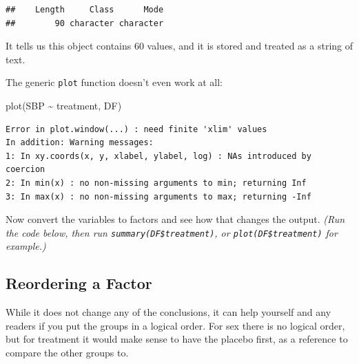 \documentclass[
]{book}
\newenvironment{Shaded}{\begin{snugshade}}{\end{snugshade}}
\newcommand{\FunctionTok}[1]{\textcolor[rgb]{0.00,0.00,0.00}{#1}}
\newcommand{\NormalTok}[1]{#1}
\newcommand{\OtherTok}[1]{\textcolor[rgb]{0.56,0.35,0.01}{#1}}
\newcommand{\SpecialCharTok}[1]{\textcolor[rgb]{0.00,0.00,0.00}{#1}}
\begin{document}
\begin{verbatim}
##    Length     Class      Mode 
##        90 character character
\end{verbatim}

It tells us this object contains 60 values, and it is stored and treated as a string of text.

The generic \texttt{plot} function doesn't even work at all:

\begin{Shaded}
\begin{Highlighting}[]
\FunctionTok{plot}\NormalTok{(SBP }\SpecialCharTok{\textasciitilde{}}\NormalTok{ treatment, DF)}
\end{Highlighting}
\end{Shaded}

\begin{verbatim}
Error in plot.window(...) : need finite 'xlim' values
In addition: Warning messages:
1: In xy.coords(x, y, xlabel, ylabel, log) : NAs introduced by coercion
2: In min(x) : no non-missing arguments to min; returning Inf
3: In max(x) : no non-missing arguments to max; returning -Inf
\end{verbatim}

Now convert the variables to factors and see how that changes the output. \emph{(Run the code below, then run \texttt{summary(DF\$treatment)}, or \texttt{plot(DF\$treatment)} for example.)}

\begin{Shaded}
\end{Shaded}

\hypertarget{reordering-a-factor}{%
\subsection*{Reordering a Factor}\label{reordering-a-factor}}

While it does not change any of the conclusions, it can help yourself and any readers if you put the groups in a logical order. For sex there is no logical order, but for treatment it would make sense to have the placebo first, as a reference to compare the other groups to.
\end{document}
